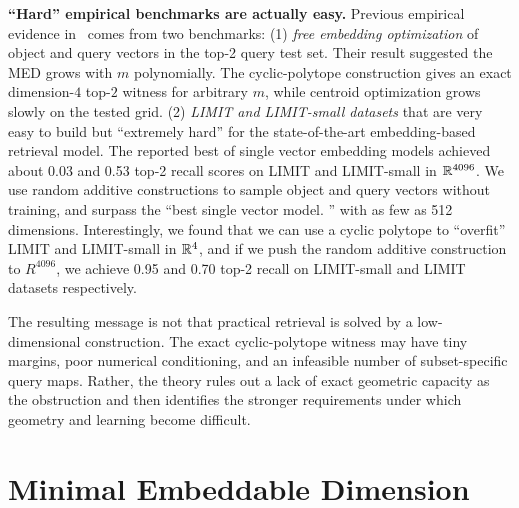 \documentclass{article}
\begin{document}
\noindent\textbf{``Hard'' empirical benchmarks are actually easy.}
Previous empirical evidence in~\citep{weller2025theoretical} comes from two benchmarks: (1) \textit{free embedding optimization} of object and query vectors in the top-2 query test set. Their result suggested the MED grows with $m$ polynomially. The cyclic-polytope construction gives an exact dimension-$4$ top-$2$ witness for arbitrary $m$, while centroid optimization grows slowly on the tested grid. (2) \textit{LIMIT and LIMIT-small datasets} that are very easy to build but ``extremely hard'' for the state-of-the-art embedding-based retrieval model.
The reported best of single vector embedding models achieved about 0.03 and 0.53 top-2 recall scores on LIMIT and LIMIT-small in $\mathbb{R}^{4096}$. We use random additive constructions to sample object and query vectors without training, and surpass the ``best single vector model. '' with as few as 512 dimensions. Interestingly, we found that we can use a cyclic polytope to ``overfit'' LIMIT and LIMIT-small in $\mathbb{R}^4$, and if we push the random additive construction to $R^{4096}$, we achieve 0.95 and 0.70 top-2 recall on LIMIT-small and LIMIT datasets respectively.

The resulting message is not that practical retrieval is solved by a low-dimensional construction. The exact cyclic-polytope witness may have tiny margins, poor numerical conditioning, and an infeasible number of subset-specific query maps. Rather, the theory rules out a lack of exact geometric capacity as the obstruction and then identifies the stronger requirements under which geometry and learning become difficult.

\section{Minimal Embeddable Dimension}\label{sec:problem-definition}
\end{document}
